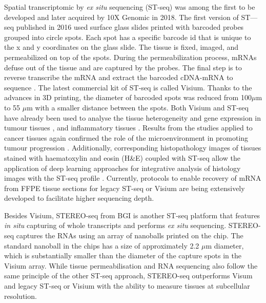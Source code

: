 Spatial transcriptomic by \textit{ex situ} sequencing (ST-seq) was among the first to be developed and later acquired by 10X Genomic in 2018. The first version of ST—seq published in 2016 used surface glass slides printed with barcoded probes grouped into circle spots. Each spot has a specific barcode id that is unique to the x and y coordinates on the glass slide. The tissue is fixed, imaged, and permeabilized on top of the spots. During the permeabilization process, mRNAs defuse out of the tissue and are captured by the probes. The final step is to reverse transcribe the mRNA and extract the barcoded cDNA-mRNA to sequence \cite{staahl2016visualization, berglund2018spatial}. The latest commercial kit of ST-seq is called Visium. Thanks to the advances in 3D printing, the diameter of barcoded spots was reduced from  100$\mu$m to 55 $\mu$m with a smaller distance between the spots.  Both  Visium and ST-seq have already been used to analyse the tissue heterogeneity and gene expression in tumour tissues \cite{berglund2018spatial, thrane2018spatially, moncada2019integrating,ji2020multimodal, yoosuf2020identification}, and inflammatory tissues \cite{carlberg2019exploring}. Results from the studies applied to cancer tissues again confirmed the role of the microenvironment in promoting tumour progression \cite{thrane2018spatially, moncada2019integrating}. Additionally, corresponding histopathology images of tissues stained with haematoxylin and eosin (H\&E) coupled with ST-seq allow the application of deep learning approaches for integrative analysis of histology images with the ST-seq profile \cite{he2020integrating, tan2019spacell}. Currently, protocols to enable recovery of mRNA from FFPE tissue sections for legacy ST-seq or Visium are being extensively developed to facilitate higher sequencing depth.           

Besides Visium, STEREO-seq from BGI is another ST-seq platform that features \textit{in situ} capturing of whole transcripts and performs \textit{ex situ} sequencing. STEREO-seq captures the RNAs using an array of nanoballs printed on the chip. The standard nanoball in the chips has a size of approximately 2.2 $\mu$m diameter, which is substantially smaller than the diameter of the capture spots in the Visium array. While tissue permeabilisation and RNA sequencing also follow the same principle of the other ST-seq approach, STEREO-seq outperforms Visum and legacy ST-seq or Visium with the ability to measure tissues at subcellular resolution.    

